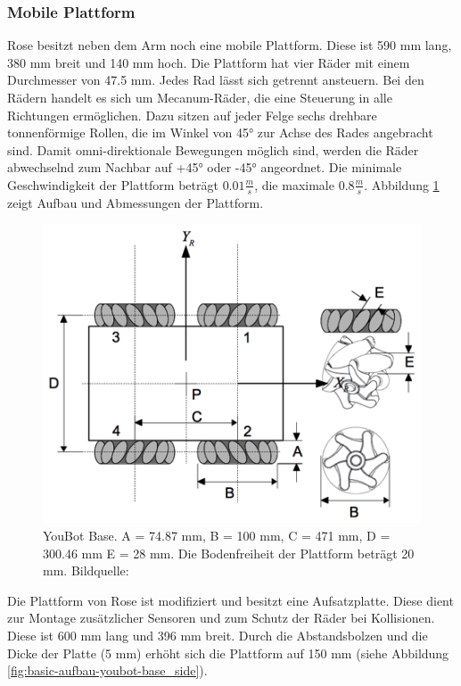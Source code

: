 \subsubsection{Mobile Plattform}
Rose besitzt neben dem Arm noch eine mobile Plattform. Diese ist 590 mm lang, 380 mm breit und 140 mm hoch. Die Plattform hat vier Räder mit einem Durchmesser von 47.5 mm. Jedes Rad lässt sich getrennt ansteuern. Bei den Rädern handelt es sich um Mecanum-Räder, die eine Steuerung in alle Richtungen ermöglichen. Dazu sitzen auf jeder Felge sechs drehbare tonnenförmige Rollen, die im Winkel von 45° zur Achse des Rades angebracht sind. Damit omni-direktionale Bewegungen möglich sind, werden die Räder abwechselnd zum Nachbar auf +45° oder -45° angeordnet. Die minimale Geschwindigkeit der Plattform beträgt $0.01\frac{m}{s}$, die maximale  $0.8\frac{m}{s}$. Abbildung \ref{fig:basic-aufbau-youbot-base} zeigt Aufbau und Abmessungen der Plattform. 

\begin{figure}[H]
	\centering
	\includegraphics[scale=0.8]{fig/kukabase}   
	\caption[YouBot Base]{YouBot Base. A = 74.87 mm, B = 100 mm, C = 471 mm, D = 300.46 mm E = 28 mm. Die Bodenfreiheit der Plattform beträgt 20 mm. Bildquelle: \cite{monikaflorekjasinska2015}}
	\label{fig:basic-aufbau-youbot-base}
\end{figure}

Die Plattform von Rose ist modifiziert und besitzt eine Aufsatzplatte. Diese dient zur Montage zusätzlicher Sensoren und zum Schutz der Räder bei Kollisionen. Diese ist 600 mm lang und 396 mm breit. Durch die Abstandsbolzen und die Dicke der Platte (5 mm) erhöht sich die Plattform auf 150 mm (siehe Abbildung \ref{fig:basic-aufbau-youbot-base_side}).  

